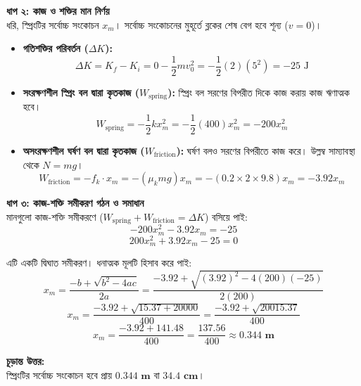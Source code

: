 \documentclass[12pt, a4paper]{article}
\begin{document}
\begin{tcolorbox}[solutionbox={সমাধান (Solution)}]
\vspace{0.5em}
\noindent
\textbf{ধাপ ২: কাজ ও শক্তির মান নির্ণয়} \\
ধরি, স্প্রিংটির সর্বোচ্চ সংকোচন $x_m$। সর্বোচ্চ সংকোচনের মুহূর্তে ব্লকের শেষ বেগ হবে শূন্য ($v = 0$)।
\begin{itemize}[leftmargin=*, parsep=0.3ex]
    \item \textbf{গতিশক্তির পরিবর্তন ($\Delta K$):}
    $$\Delta K = K_f - K_i = 0 - \frac{1}{2} m v_0^2 = -\frac{1}{2} (2) (5^2) = -25\text{ J}$$
    
    \item \textbf{সংরক্ষণশীল স্প্রিং বল দ্বারা কৃতকাজ ($W_{\text{spring}}$):}
    স্প্রিং বল সরণের বিপরীত দিকে কাজ করায় কাজ ঋণাত্মক হবে।
    $$W_{\text{spring}} = -\frac{1}{2} k x_m^2 = -\frac{1}{2} (400) x_m^2 = -200 x_m^2$$
    
    \item \textbf{অসংরক্ষণশীল ঘর্ষণ বল দ্বারা কৃতকাজ ($W_{\text{friction}}$):}
    ঘর্ষণ বলও সরণের বিপরীতে কাজ করে। উল্লম্ব সাম্যাবস্থা থেকে $N = mg$।
    $$W_{\text{friction}} = -f_k \cdot x_m = -(\mu_k m g) x_m = -(0.2 \times 2 \times 9.8) x_m = -3.92 x_m$$
\end{itemize}

\vspace{0.5em}
\noindent
\textbf{ধাপ ৩: কাজ-শক্তি সমীকরণ গঠন ও সমাধান} \\
মানগুলো কাজ-শক্তি সমীকরণে ($W_{\text{spring}} + W_{\text{friction}} = \Delta K$) বসিয়ে পাই:
$$-200 x_m^2 - 3.92 x_m = -25$$ 
$$200 x_m^2 + 3.92 x_m - 25 = 0$$

এটি একটি দ্বিঘাত সমীকরণ। ধনাত্মক মূলটি হিসাব করে পাই:
$$x_m = \frac{-b + \sqrt{b^2 - 4ac}}{2a} = \frac{-3.92 + \sqrt{(3.92)^2 - 4(200)(-25)}}{2(200)}$$ 
$$x_m = \frac{-3.92 + \sqrt{15.37 + 20000}}{400} = \frac{-3.92 + \sqrt{20015.37}}{400}$$ 
$$x_m = \frac{-3.92 + 141.48}{400} = \frac{137.56}{400} \approx \mathbf{0.344\text{ m}}$$

\vspace{1em}
\begin{tcolorbox}[answerbox]
\textbf{চূড়ান্ত উত্তর:} \\
স্প্রিংটির সর্বোচ্চ সংকোচন হবে প্রায় $\mathbf{0.344\text{ m}}$ বা $\mathbf{34.4\text{ cm}}$।
\end{tcolorbox}
\end{tcolorbox}
\end{document}
